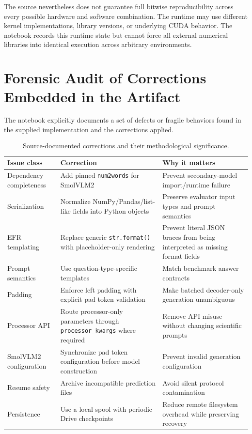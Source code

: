 \documentclass[11pt,a4paper]{article}
\newcommand{\code}[1]{\texttt{#1}}
\begin{document}
The source nevertheless does not guarantee full bitwise reproducibility across every possible hardware and software combination. The runtime may use different kernel implementations, library versions, or underlying CUDA behavior. The notebook records this runtime state but cannot force all external numerical libraries into identical execution across arbitrary environments.

\section{Forensic Audit of Corrections Embedded in the Artifact}
The notebook explicitly documents a set of defects or fragile behaviors found in the supplied implementation and the corrections applied.

\begin{table}[ht]
\centering
\small
\caption{Source-documented corrections and their methodological significance.}
\label{tab:fixes}
\begin{tabular}{p{}p{}p{}}
\toprule
Issue class & Correction & Why it matters \\
\midrule
Dependency completeness & Add pinned \code{num2words} for SmolVLM2 & Prevent secondary-model import/runtime failure \\
Serialization & Normalize NumPy/Pandas/list-like fields into Python objects & Preserve evaluator input types and prompt semantics \\
EFR templating & Replace generic \code{str.format()} with placeholder-only rendering & Prevent literal JSON braces from being interpreted as missing format fields \\
Prompt semantics & Use question-type-specific templates & Match benchmark answer contracts \\
Padding & Enforce left padding with explicit pad token validation & Make batched decoder-only generation unambiguous \\
Processor API & Route processor-only parameters through \code{processor\_kwargs} where required & Remove API misuse without changing scientific prompts \\
SmolVLM2 configuration & Synchronize pad token configuration before model construction & Prevent invalid generation configuration \\
Resume safety & Archive incompatible prediction files & Avoid silent protocol contamination \\
Persistence & Use a local spool with periodic Drive checkpoints & Reduce remote filesystem overhead while preserving recovery \\
\bottomrule
\end{tabular}
\end{table}
\end{document}
